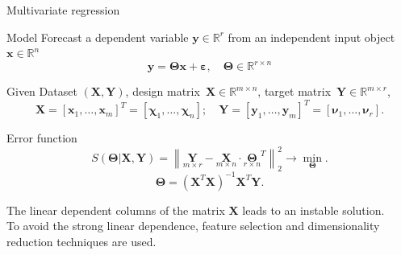 \documentclass[9pt]{beamer}
\newcommand{\bx}{\mathbf{x}}
\newcommand{\by}{\mathbf{y}}
\newcommand{\bY}{\mathbf{Y}}
\newcommand{\bX}{\mathbf{X}}
\newcommand{\bbR}{\mathbb{R}}
\newcommand{\bchi}{\boldsymbol{\chi}}
\newcommand{\bnu}{\boldsymbol{\nu}}
\newcommand{\bTheta}{\boldsymbol{\Theta}}
\begin{document}
\begin{frame}{Multivariate regression}
	\begin{block}{Model}
	Forecast a dependent variable $\by \in \bbR^r$ from an independent input object $\bx \in \bbR^n$
	\[
	\by = \bTheta \bx+ \boldsymbol{\varepsilon}, \quad \bTheta \in \bbR^{r \times n}
	\]
	\vspace{-0.7cm}
	\end{block}
	\begin{block}{Given}
	Dataset $\left( \bX, \bY \right)$, design matrix~$\bX \in \bbR^{m \times n}$, target matrix~$\bY \in \bbR^{m \times r}$,
	\[
	\bX = [\bx_1, \dots, \bx_m]^{T} =  [\bchi_1, \dots, \bchi_n]; \quad \bY = [\by_1, \dots, \by_m]^{T} =  [\bnu_1, \dots, \bnu_r].
	\]
	\vspace{-0.7cm}
	\end{block}
	\begin{block}{Error function}
	\[
	S(\bTheta | \bX, \bY) = {\left\| \underset{m \times r}{\mathbf{Y}}  - \underset{m \times n}{\bX} \cdot \underset{r \times n}{\bTheta}^T \right\| }_2^2 \rightarrow\min_{\bTheta}.
	\label{eq:error_function}
	\]
	\[
	\bTheta = (\bX^{T} \bX)^{-1} \bX^{T} \bY.
	\]
	\end{block}
	The linear dependent columns of the matrix $\bX$ leads to an instable solution. \\
	To avoid the strong linear dependence, feature selection and dimensionality reduction techniques are used.
\end{frame}
\end{document}
